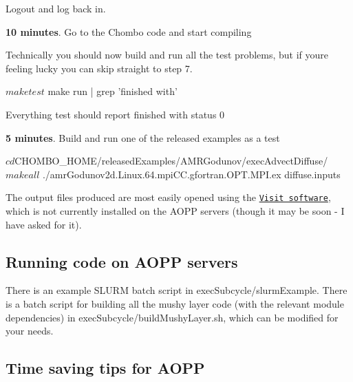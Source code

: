 \begin{DoxyEnumerate}
\item Logout and log back in.
\item {\bfseries 10 minutes}. Go to the Chombo code and start compiling 
 Technically you should now build and run all the test problems, but if you\textquotesingle{}re feeling lucky you can skip straight to step 7. 
\begin{DoxyCode}
$ make test
$ make run | grep 'finished with'
\end{DoxyCode}
 Everything test should report \textquotesingle{}finished with status 0\textquotesingle{}
\item {\bfseries 5 minutes}. Build and run one of the released examples as a test 
\begin{DoxyCode}
$ cd $CHOMBO\_HOME/releasedExamples/AMRGodunov/execAdvectDiffuse/
$ make all
$ ./amrGodunov2d.Linux.64.mpiCC.gfortran.OPT.MPI.ex diffuse.inputs 
\end{DoxyCode}
 The output files produced are most easily opened using the \href{https://wci.llnl.gov/simulation/computer-codes/visit}{\tt Visit software}, which is not currently installed on the A\+O\+PP servers (though it may be soon -\/ I have asked for it).
\end{DoxyEnumerate}

\subsection*{Running code on A\+O\+PP servers}

There is an example S\+L\+U\+RM batch script in {\ttfamily exec\+Subcycle/slurm\+Example}. There is a batch script for building all the mushy layer code (with the relevant module dependencies) in {\ttfamily exec\+Subcycle/build\+Mushy\+Layer.\+sh}, which can be modified for your needs.

\subsection*{Time saving tips for A\+O\+PP}


